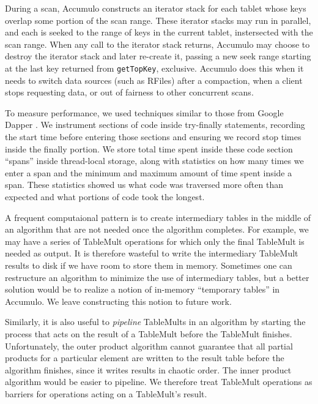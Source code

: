 During a scan, Accumulo constructs an iterator stack for each tablet whose keys overlap some portion 
of the scan range. These iterator stacks may run in parallel, and each is seeked to the range of 
keys in the current tablet, instersected with the scan range. When any call to the iterator stack 
returns, Accumulo may choose to destroy the iterator stack and later re-create it,
passing a new seek range starting at the last key returned from \texttt{getTopKey}, exclusive.
Accumulo does this when it needs to switch data sources (such as RFiles) after a compaction, 
when a client stops requesting data, or out of fairness to other concurrent scans.



To measure performance, we used techniques similar to those from Google Dapper \cite{sigelman2010dapper}.
We instrument sections of code inside try-finally statements, recording the start time before 
entering those sections and ensuring we record stop times inside the finally portion.
We store total time spent inside these code section ``spans'' inside thread-local storage,
along with statistics on how many times we enter a span and the minimum and maximum amount of time
spent inside a span. These statistics showed us what code was traversed more often than expected
and what portions of code took the longest. 


A frequent computaional pattern is to create intermediary tables in the middle of an algorithm 
that are not needed once the algorithm completes.  For example, we may have a series of TableMult operations 
for which only the final TableMult is needed as output.  It is therefore wasteful to write the intermediary
TableMult results to disk if we have room to store them in memory.
Sometimes one can restructure an algorithm to minimize the use of intermediary tables,
but a better solution would be to realize a notion of in-memory ``temporary tables'' in Accumulo.
We leave constructing this notion to future work.

Similarly, it is also useful to \emph{pipeline} TableMults in an algorithm by starting the process 
that acts on the result of a TableMult before the TableMult finishes.
Unfortunately, the outer product algorithm cannot guarantee that all partial products for a particular element 
are written to the result table before the algorithm finishes, since it writes results in chaotic order.
The inner product algorithm would be easier to pipeline.
We therefore treat TableMult operations as barriers for operations acting on a TableMult's result.

